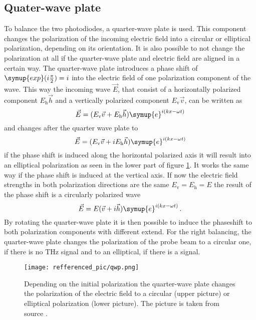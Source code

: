 \subsection{Quater-wave plate}
\label{sec:qwp}
To balance the two photodiodes, a quarter-wave plate is used.
This component changes the polarization of the incoming electric field into a circular or elliptical polarization, depending on its orientation.
It is also possible to not change the polarization at all if the quarter-wave plate and electric field are aligned in a certain way.
The quarter-wave plate introduces a phase shift of $\symup{exp}(i\frac{\pi}{2}) = i$ into the electric field of one polarization component of the wave.
This way the incoming wave $\vec{E}$, that consist of a horizontally polarized component $E_\text{h}\vec{h}$ and a vertically polarized component $E_\text{v}\vec{v}$, can be written as
\begin{equation}
    \vec{E} = (E_\text{v}\vec{v} + E_\text{h}\vec{h})\symup{e}^{i(kx-\omega t)}
\end{equation}
and changes after the quarter wave plate to 
\begin{equation}
    \vec{E} = (E_\text{v}\vec{v} + i E_\text{h}\vec{h})\symup{e}^{i(kx-\omega t)}
\end{equation}
if the phase shift is induced along the horizontal polarized axis it will result into an elliptical polarization as seen in the lower part of figure \ref{fig:qwp}.
It works the same way if the phase shift is induced at the vertical axis.
If now the electric field strengths in both polarization directions are the same $E_\text{v} = E_\text{h} = E$ the result of the phase shift is a circularly polarized wave
\begin{equation}
    \vec{E} = E(\vec{v} + i\vec{h})\symup{e}^{i(kx-\omega t)} \, .
\end{equation}
By rotating the quarter-wave plate it is then possible to induce the phaseshift to both polarization components with different extend.
For the right balancing, the quarter-wave plate changes the polarization of the probe beam to a circular one, if there is no $\si{\tera\hertz}$ signal and to an elliptical, if there is a signal.
\begin{figure}
    \centering
    \texttt{[image: refferenced\_pic/qwp.png]}
    \caption{Depending on the initial polarization the quarter-wave plate changes the polarization of the electric field to a circular (upper picture) or elliptical polarization (lower picture).
    The picture is taken from source \cite{qwp}.}
    \label{fig:qwp}
\end{figure}
\FloatBarrier
